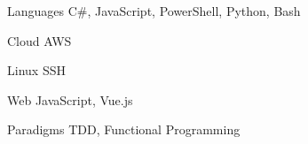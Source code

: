 

\begin{cvskills}


  \cvskill
    {Languages}
    { C\#, JavaScript, PowerShell, Python, Bash }

  \cvskill
    {Cloud}
    {AWS}

  \cvskill
    {Linux}
    { SSH }

  \cvskill
    { Web }
    { JavaScript, Vue.js }

  \cvskill
    {Paradigms}
    {TDD, Functional Programming}

\end{cvskills}



